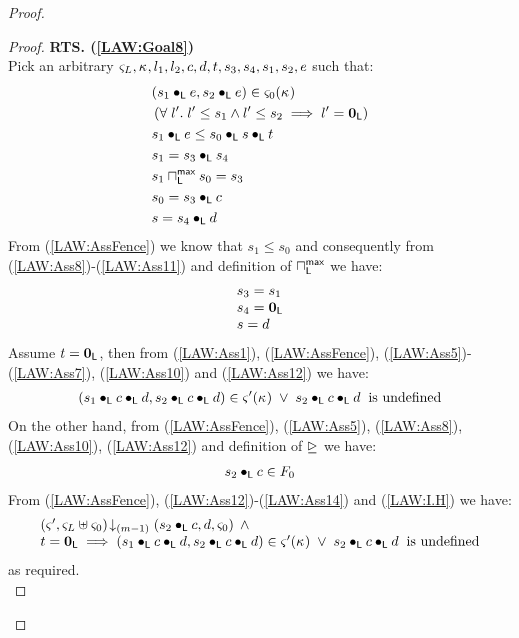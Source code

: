 \begin{lemma}[]
\begin{proof}
\begin{proof}
\noindent\textbf{RTS. (\ref{LAW:Goal8})} \\
Pick an arbitrary $\varsigma_{L}, \kappa_{}, l_1, l_2, c, d, t, s_3, s_4, s_1, s_2, e$ such that:
%
\begin{align}
	& (s_1 \bullet_{\textsf{L}} e, s_2 \bullet_{\textsf{L}} e) \in \varsigma_{0}(\kappa_{}) \label{LAW:Ass5} \\
	& \left(\forall\; l'.\; l' \leq s_1 \land l' \leq s_2 \implies l' = \mathbf{0}_{\textsf{L}}\right) \label{LAW:Ass6}\\
	& s_1 \bullet_{\textsf{L}} e \leq  s_0 \bullet_{\textsf{L}} s \bullet_{\textsf{L}} t\label{LAW:Ass7}\\
	& s_1 = s_3 \bullet_{\textsf{L}} s_4 \label{LAW:Ass8}\\
	& s_1 \sqcap_{\textsf{L}}^{\textsf{max}} s_0 = s_3 \label{LAW:Ass9}\\
	& s_0 = s_3 \bullet_{\textsf{L}} c \label{LAW:Ass10}\\
	& s= s_4 \bullet_{\textsf{L}} d \label{LAW:Ass11}
\end{align}
From (\ref{LAW:AssFence}) we know that $s_1 \leq s_0$ and consequently from (\ref{LAW:Ass8})-(\ref{LAW:Ass11}) and definition of $\sqcap_{\textsf{L}}^{\textsf{max}}$ we have:
%
\begin{align}
\begin{array}{l}
	s_3 = s_1 \\
	s_4 = \mathbf{0}_{\textsf{L}}\\
	s = d
\end{array} \label{LAW:Ass12}
\end{align}
Assume $t = \mathbf{0}_{\textsf{L}}$, then from (\ref{LAW:Ass1}), (\ref{LAW:AssFence}), (\ref{LAW:Ass5})-(\ref{LAW:Ass7}), (\ref{LAW:Ass10}) and (\ref{LAW:Ass12}) we have:
%
\begin{align}
	(s_1 \bullet_{\textsf{L}} c \bullet_{\textsf{L}} d, s_2 \bullet_{\textsf{L}} c \bullet_{\textsf{L}} d) \in \varsigma_{}'(\kappa_{}) \;\lor\; s_2 \bullet_{\textsf{L}} c \bullet_{\textsf{L}} d \hspace*{0.2cm} \text{is undefined} \label{LAW:Ass13}
\end{align}
%
On the other hand, from (\ref{LAW:AssFence}), (\ref{LAW:Ass5}), (\ref{LAW:Ass8}), (\ref{LAW:Ass10}), (\ref{LAW:Ass12}) and definition of $\unrhd$ we have:
%
\begin{align}
	s_2 \bullet_{\textsf{L}} c \in F_0 \label{LAW:Ass14}
\end{align}
%
From (\ref{LAW:AssFence}), (\ref{LAW:Ass12})-(\ref{LAW:Ass14}) and (\ref{LAW:I.H}) we have:
%
%
\begin{align}
\begin{array}{l}
	\left(\varsigma_{}', \varsigma_{L} \uplus \varsigma_{0}\right) \!\downarrow_{(m-1)} \left(s_2 \bullet_{\textsf{L}} c, d, \varsigma_{0}\right) \;\land\\
	t = \mathbf{0}_{\textsf{L}} \implies (s_1 \bullet_{\textsf{L}} c \bullet_{\textsf{L}} d, s_2 \bullet_{\textsf{L}} c \bullet_{\textsf{L}} d) \in \varsigma_{}'(\kappa_{}) \;\lor\; s_2 \bullet_{\textsf{L}} c \bullet_{\textsf{L}} d \hspace*{0.2cm} \text{is undefined}
\end{array} \nonumber
\end{align}
as required.\\


\end{proof}
\end{proof}
\end{lemma}
